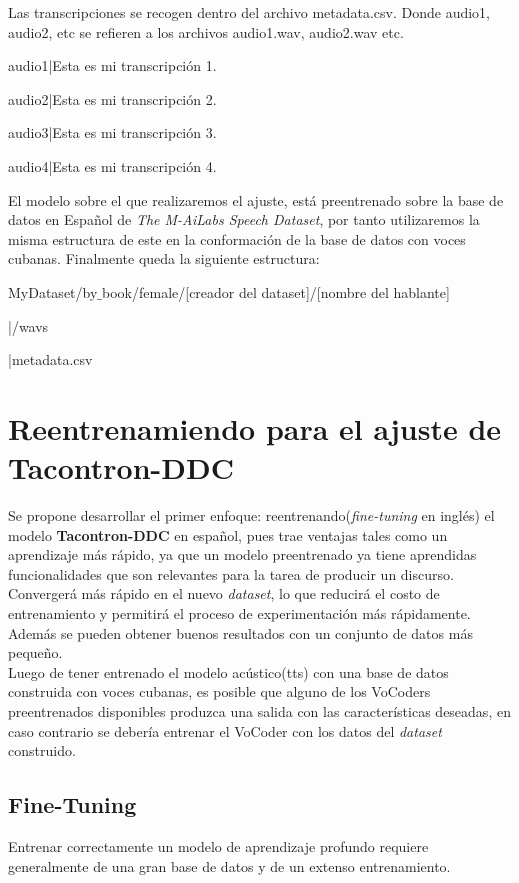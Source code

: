 Las transcripciones se recogen dentro del archivo metadata.csv. Donde audio1, audio2, etc se refieren a los archivos audio1.wav, audio2.wav etc.

\begin{center}
	audio1|Esta es mi transcripción 1.
	
	audio2|Esta es mi transcripción 2.
	
	audio3|Esta es mi transcripción 3.
	
	audio4|Esta es mi transcripción 4.
\end{center}

El modelo sobre el que realizaremos el ajuste, está preentrenado sobre la base de datos en Español de \textit{The M-AiLabs Speech Dataset}, por tanto utilizaremos la misma estructura de este en la conformación de la base de datos con voces cubanas. Finalmente queda la siguiente estructura:

\begin{flushleft}
	MyDataset/by$\_$book/female/[creador del dataset]/[nombre del hablante]
	
	|/wavs
	
	|metadata.csv
\end{flushleft}

\section{Reentrenamiendo para el ajuste de Tacontron-DDC}

Se propone desarrollar el primer enfoque: reentrenando(\textit{fine-tuning} en inglés) el modelo \textbf{Tacontron-DDC} en español, pues trae ventajas tales como un aprendizaje más rápido, ya que un modelo preentrenado ya tiene aprendidas funcionalidades que son relevantes para la tarea de producir un discurso. Convergerá más rápido en el nuevo \textit{dataset}, lo que reducirá el costo de entrenamiento y permitirá el proceso de experimentación más rápidamente. Además se pueden obtener buenos resultados con un conjunto de datos más pequeño.  \\

Luego de tener entrenado el modelo acústico(tts) con una base de datos construida con voces cubanas, es posible que alguno de los VoCoders preentrenados disponibles produzca una salida con las características deseadas, en caso contrario se debería entrenar el VoCoder con los datos del \textit{dataset} construido.

\subsection{Fine-Tuning}
Entrenar correctamente un modelo de aprendizaje profundo requiere generalmente de una gran base de datos y de un extenso entrenamiento.

